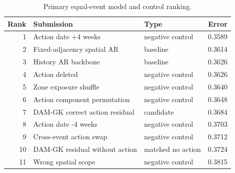 \begin{table}[H]
\caption{Primary equal-event model and control ranking.}
\label{tab:tab1_primary_scores}
\small
\begin{tabular}{rllr}
\toprule
Rank & Submission & Type & Error \\
\midrule
1 & Action date +4 weeks & negative control & 0.3589 \\
2 & Fixed-adjacency spatial AR & baseline & 0.3614 \\
3 & History AR backbone & baseline & 0.3626 \\
4 & Action deleted & negative control & 0.3626 \\
5 & Zone exposure shuffle & negative control & 0.3640 \\
6 & Action component permutation & negative control & 0.3648 \\
7 & DAM-GK correct action residual & candidate & 0.3684 \\
8 & Action date -4 weeks & negative control & 0.3703 \\
9 & Cross-event action swap & negative control & 0.3712 \\
10 & DAM-GK residual without action & matched no action & 0.3724 \\
11 & Wrong spatial scope & negative control & 0.3815 \\
\bottomrule
\end{tabular}
\end{table}
